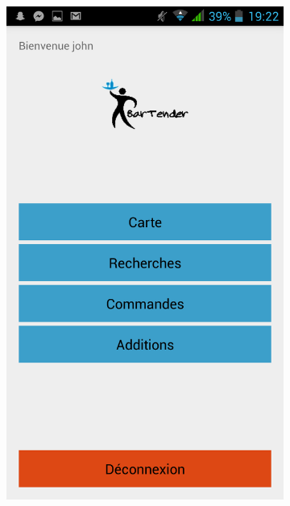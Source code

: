 \begin{figure}[H]
    \centering
    \begin{subfigure}
        \centering
        \includegraphics[scale=0.2]{img/waiter-logged.png}
    \end{subfigure}%
    ~ 
    \begin{subfigure}
        \centering

\end{subfigure}
\end{figure}
